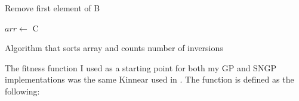 \documentclass{article}
\newcommand{\assign}[2]{$#1 \leftarrow$ #2}
\begin{document}
\begin{algorithm}
{{{{                            Remove first element of B
                            
                        }
                    }
                    
                    
                    \assign{arr}{C}
                    
                }
                
                
            }
            
            \caption{Algorithm that sorts array and counts number of inversions}
            
            
            
            \label{alg:countInv}
            
        \end{algorithm}
        
        The fitness function I used as a starting point for both my GP and SNGP implementations was the same Kinnear used in \cite{kinnear_evolving_1993,kinnear_generality_1993}. The function is defined as the following:
        
\end{document}
